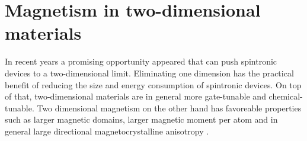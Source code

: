 



\section{Magnetism in two-dimensional materials}
In recent years a promising opportunity appeared that can push spintronic devices to a two-dimensional limit. Eliminating one dimension has the practical benefit of reducing the size and energy consumption of spintronic devices. On top of that, two-dimensional materials are in general more gate-tunable and chemical-tunable. Two dimensional magnetism on the other hand has favoreable properties such as larger magnetic domains, larger magnetic moment per atom and in general large directional magnetocrystalline anisotropy \cite{sethulakshmi_magnetism_2019, zhang_van_2019}.

